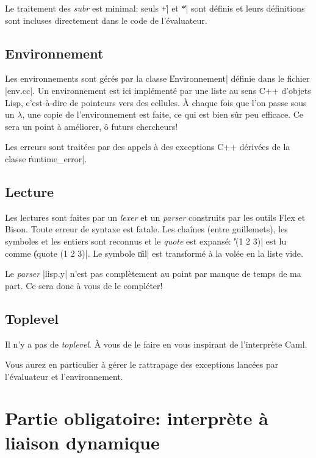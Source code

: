 \documentclass{../../../LaTeX/tdsimple}
\begin{document}
Le traitement des \emph{subr} est minimal: seuls \|+| et \|*| sont
définis et leurs définitions sont incluses directement dans le code de
l'évaluateur.

\subsection{Environnement}

Les environnements sont gérés par la classe \|Environnement| définie
dans le fichier \file|env.cc|. Un environnement est ici implémenté par
une liste au sens C++ d'objets Lisp, c'est-à-dire de pointeurs vers
des cellules. À chaque fois que l'on passe sous un $\lambda$, une
copie de l'environnement est faite, ce qui est bien sûr peu
efficace. Ce sera un point à améliorer, ô futurs chercheurs!

Les erreurs sont traitées par des appels à des exceptions C++ dérivées
de la classe \|runtime_error|.

\subsection{Lecture}

Les lectures sont faites par un \emph{lexer} et un \emph{parser}
construits par les outils Flex et Bison. Toute erreur de syntaxe est
fatale. Les chaînes (entre guillemets), les symboles et les entiers
sont reconnus et le \emph{quote} est expansé: \|'(1 2 3)| est lu
comme %
\|(quote (1 2 3)|. Le symbole \|nil| est transformé à la volée en la
liste vide.

\begin{attention}
  Le \emph{parser} \file|lisp.y| n'est pas complètement au point par
  manque de temps de ma part. Ce sera donc à vous de le
  compléter!~\smiley
\end{attention}

\subsection{Toplevel}

Il n'y a pas de \emph{toplevel}. À vous de le faire en vous inspirant
de l'interprète Caml.
\begin{attention}
  Vous aurez en particulier à gérer le rattrapage des exceptions
  lancées par l'évaluateur et l'environnement.
\end{attention}

\section{Partie obligatoire: interprète à liaison dynamique}
\end{document}
